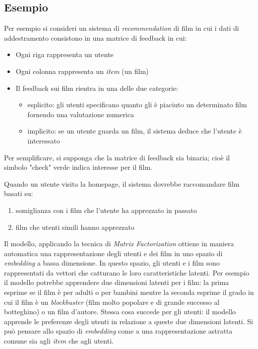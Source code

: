 \subsection{Esempio}

Per esempio si consideri un sistema di \textit{recommendation} di film in cui i dati di addestramento consistono in una matrice di feedback in cui:

\begin{itemize}
    \item Ogni riga rappresenta un utente
    \item Ogni colonna rappresenta un \textit{item} (un film)
    \item Il feedback sui film rientra in una delle due categorie:
    \begin{itemize}
        \item esplicito: gli utenti specificano quanto gli è piaciuto un determinato film fornendo una valutazione numerica
        \item implicito: se un utente guarda un film, il sistema deduce che l'utente è interessato
    \end{itemize}
\end{itemize}

Per semplificare, si supponga che la matrice di feedback sia binaria; cioè il simbolo "check" verde indica interesse per il film.

Quando un utente visita la homepage, il sistema dovrebbe raccomandare film basati su:

\begin{enumerate}
    \item somiglianza con i film che l'utente ha apprezzato in passato
    \item film che utenti simili hanno apprezzato
\end{enumerate}

Il modello, applicando la tecnica di \textit{Matrix Factorization} ottiene in maniera automatica una rappresentazione degli utenti e dei film in uno spazio di \textit{embedding} a bassa dimensione. In questo spazio, gli utenti e i film sono rappresentati da vettori che catturano le loro caratteristiche latenti. Per esempio il modello potrebbe apprendere due dimensioni latenti per i film: la prima esprime se il film è per adulti o per bambini mentre la seconda esprime il grado in cui il film è un \textit{blockbuster} (film molto popolare e di grande successo al botteghino) o un film d'autore. Stessa cosa succede per gli utenti: il modello apprende le preferenze degli utenti in relazione a queste due dimensioni latenti. Si può pensare allo spazio di \textit{embedding} come a una rappresentazione astratta comune sia agli \textit{item} che agli utenti.

